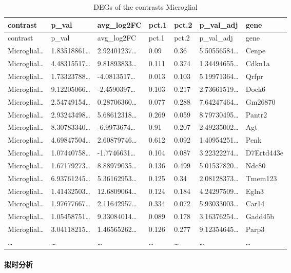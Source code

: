 \documentclass[
]{article}
\begin{document}
\begin{longtable}[]{@{}lllllll@{}}
\caption{\label{tab:DEGs-of-the-contrasts-Microglial}DEGs of the contrasts Microglial}\tabularnewline
\toprule
contrast & p\_val & avg\_log2FC & pct.1 & pct.2 & p\_val\_adj & gene\tabularnewline
\midrule
\endfirsthead
\toprule
contrast & p\_val & avg\_log2FC & pct.1 & pct.2 & p\_val\_adj & gene\tabularnewline
\midrule
\endhead
Microglial\ldots{} & 1.83518861\ldots{} & 2.92401237\ldots{} & 0.09 & 0.36 & 5.50556584\ldots{} & Cenpe\tabularnewline
Microglial\ldots{} & 4.48315517\ldots{} & 9.81893833\ldots{} & 0.111 & 0.374 & 1.34494655\ldots{} & Cdkn1a\tabularnewline
Microglial\ldots{} & 1.73323788\ldots{} & -4.0813517\ldots{} & 0.013 & 0.103 & 5.19971364\ldots{} & Qrfpr\tabularnewline
Microglial\ldots{} & 9.12205066\ldots{} & -2.4590397\ldots{} & 0.103 & 0.217 & 2.73661519\ldots{} & Dock6\tabularnewline
Microglial\ldots{} & 2.54749154\ldots{} & 0.28706360\ldots{} & 0.077 & 0.288 & 7.64247464\ldots{} & Gm26870\tabularnewline
Microglial\ldots{} & 2.93243498\ldots{} & 5.68612318\ldots{} & 0.269 & 0.059 & 8.79730495\ldots{} & Pantr2\tabularnewline
Microglial\ldots{} & 8.30783340\ldots{} & -6.9973674\ldots{} & 0.91 & 0.207 & 2.49235002\ldots{} & Agt\tabularnewline
Microglial\ldots{} & 4.69847504\ldots{} & 2.60879746\ldots{} & 0.612 & 0.092 & 1.40954251\ldots{} & Penk\tabularnewline
Microglial\ldots{} & 1.07440758\ldots{} & -1.7746631\ldots{} & 0.104 & 0.087 & 3.22322274\ldots{} & D7Ertd443e\tabularnewline
Microglial\ldots{} & 1.67179273\ldots{} & 8.88979035\ldots{} & 0.136 & 0.499 & 5.01537820\ldots{} & Ndc80\tabularnewline
Microglial\ldots{} & 6.93761245\ldots{} & 5.36162953\ldots{} & 0.125 & 0.34 & 2.08128373\ldots{} & Tmem123\tabularnewline
Microglial\ldots{} & 1.41432503\ldots{} & 12.6809064\ldots{} & 0.124 & 0.184 & 4.24297509\ldots{} & Egln3\tabularnewline
Microglial\ldots{} & 1.97677667\ldots{} & 2.11642957\ldots{} & 0.334 & 0.072 & 5.93033003\ldots{} & Car14\tabularnewline
Microglial\ldots{} & 1.05458751\ldots{} & 9.33084014\ldots{} & 0.089 & 0.178 & 3.16376254\ldots{} & Gadd45b\tabularnewline
Microglial\ldots{} & 3.04118215\ldots{} & 1.46565262\ldots{} & 0.126 & 0.277 & 9.12354645\ldots{} & Parp3\tabularnewline
\ldots{} & \ldots{} & \ldots{} & \ldots{} & \ldots{} & \ldots{} & \ldots{}\tabularnewline
\bottomrule
\end{longtable}

\hypertarget{ux62dfux65f6ux5206ux6790}{%
\paragraph{拟时分析}\label{ux62dfux65f6ux5206ux6790}}
\end{document}
